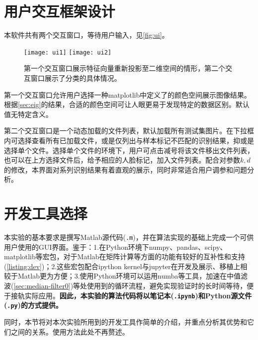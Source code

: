 \section{用户交互框架设计}
\label{sec:ui}

本软件共有两个交互窗口，等待用户输入，见\autoref{fig:ui}。

\begin{figure}[H]
    \centering
    \texttt{[image: ui1]}
    \texttt{[image: ui2]}
    \caption{第一个交互窗口展示特征向量重新投影至二维空间的情形，第二个交互窗口展示了分类的具体情况。}
    \label{fig:ui}
\end{figure}

第一个交互窗口允许用户选择一种matplotlib中定义了的颜色空间展示图像结果。根据\autoref{sec:eig}的结果，合适的颜色空间可让人眼更易于发现特定的数据区别。默认值无特定含义。

第二个交互窗口是一个动态加载的文件列表，默认加载所有测试集图片。在下拉框内可选择查看所有已加载文件，或是仅列出与样本标记不匹配的识别结果，抑或是选择单个文件。选择单个文件的环境下，用户可点击减号将该文件移出文件列表，也可以在上方选择文件后，给予相应的人脸标记，加入文件列表。配合对参数$k, d$的修改，本界面对系列识别结果有着直观的展示，同时非常适合用户调参和问题分析。

\section{开发工具选择}
\label{sec:dev}
本实验的基本要求是撰写Matlab源代码(\verb|.m|)，并在算法实现的基础上完成一个可供用户使用的GUI界面。鉴于：1.在Python环境下numpy、pandas、scipy、matplotlib等宏包，对于Matlab在矩阵计算等方面的功能有较好的互补性和支持(\autoref{listing:dev})；2.这些宏包配合ipython kernel与jupyter在开发及展示、移植上相较于Matlab更为方便；3.使用Python环境可以运用numba等工具，加速在中值滤波(\autoref{sec:median-filter0})等处使用到的循环流程，避免实现验证时的长时间等待，便于接轨实际应用。{\bfseries 因此，本实验的算法代码将以笔记本(\verb|.ipynb|)和Python源文件(\verb|.py|)的方式提供。}

同时，本节将对本次实验所用到的开发工具作简单的介绍，并重点分析其优势和它们之间的关系。使用方法此处不再赘述。

